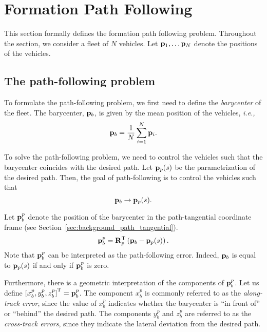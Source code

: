 \section{Formation Path Following}
\label{sec:background_formation_path_following}

This section formally defines the formation path following problem.
Throughout the section, we consider a fleet of $N$ vehicles.
Let $\mathbf{p}_1, \ldots \mathbf{p}_N$ denote the positions of the vehicles.

\subsection{The path-following problem}
To formulate the path-following problem, we first need to define the \emph{barycenter} of the fleet.
The barycenter, $\mathbf{p}_b$, is given by the mean position of the vehicles, \emph{i.e.,}
\begin{equation}
    \mathbf{p}_b = \frac{1}{N} \sum_{i=1}^N \mathbf{p}_i.
    \label{eq:background_p_b}
\end{equation}

To solve the path-following problem, we need to control the vehicles such that the barycenter coincides with the desired path.
Let $\mathbf{p}_p(s)$ be the parametrization of the desired path.
Then, the goal of path-following is to control the vehicles such that
\begin{equation}
    \mathbf{p}_b \rightarrow \mathbf{p}_p(s).
\end{equation}

Let $\mathbf{p}_b^p$ denote the position of the barycenter in the path-tangential coordinate frame (see Section~\ref{sec:background_path_tangential}).
\begin{equation}
    \mathbf{p}_b^p = \mathbf{R}_p^{\mathrm{T}} \left(\mathbf{p}_b - \mathbf{p}_p(s)\right).
\end{equation}
Note that $\mathbf{p}_b^p$ can be interpreted as the path-following error.
Indeed, $\mathbf{p}_b$ is equal to $\mathbf{p}_p(s)$ if and only if $\mathbf{p}_b^p$ is zero.

Furthermore, there is a geometric interpretation of the components of $\mathbf{p}_b^p$.
Let us define $\left[x_b^p, y_b^p, z_b^p\right]^{\mathrm{T}} = \mathbf{p}_b^p$.
The component $x_b^p$ is commonly referred to as the \emph{along-track error}, since the value of $x_b^p$ indicates whether the barycenter is ``in front of'' or ``behind'' the desired path.
The components $y_b^p$ and $z_b^p$ are referred to as the \emph{cross-track errors}, since they indicate the lateral deviation from the desired path.

